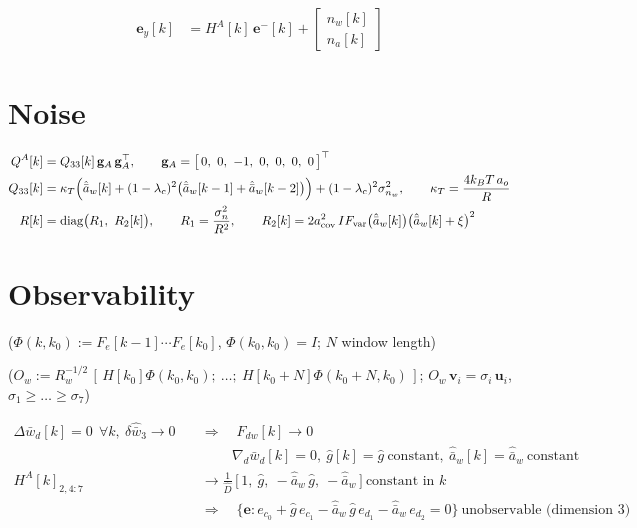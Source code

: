 \documentclass[11pt,a4paper,fontset=none]{ctexart}
\newcommand{\ba}{\bar{a}}
\newcommand{\bw}{\bar{w}}
\newcommand{\ah}{\hat{\ba}_w}
\newcommand{\gh}{\hat g}
\newcommand{\Dh}{\hat D}
\begin{document}
\begin{align*}
\mathbf{e}_y[k] &= H^{A}[k]\,\mathbf{e}^{-}[k] + \begin{bmatrix} n_w[k] \\ n_a[k] \end{bmatrix}
\end{align*}

\section{Noise}

\begin{align*}
Q^{A}[k]  &= Q_{33}[k]\,\mathbf{g}_A\,\mathbf{g}_A^{\top}, \qquad \mathbf{g}_A = \bigl[\,0,\ 0,\ -1,\ 0,\ 0,\ 0,\ 0\,\bigr]^{\top} \\
Q_{33}[k] &= \kappa_T\Bigl(\ah[k] + (1-\lambda_c)^{2}\bigl(\ah[k-1] + \ah[k-2]\bigr)\Bigr) + (1-\lambda_c)^{2}\sigma^{2}_{n_w},
\qquad \kappa_T = \frac{4k_BT\,a_o}{R} \\
R[k]      &= \mathrm{diag}\bigl(R_1,\ R_2[k]\bigr), \qquad R_1 = \frac{\sigma^{2}_{n}}{R^{2}}, \qquad
R_2[k] = 2a_{\mathrm{cov}}^{2}\,IF_{\mathrm{var}}\bigl(\ah[k]\bigr)\bigl(\ah[k] + \xi\bigr)^{2}
\end{align*}

\clearpage
\section{Observability}

($\Phi(k,k_0) := F_e[k-1]\cdots F_e[k_0]$, $\Phi(k_0,k_0) = I$; $N$ window length)

($O_w := R_w^{-1/2}\,[\,H[k_0]\Phi(k_0,k_0);\ \dots;\ H[k_0+N]\Phi(k_0+N,k_0)\,]$;
$O_w\,\mathbf{v}_i = \sigma_i\,\mathbf{u}_i$, $\sigma_1 \ge \dots \ge \sigma_7$)

\begin{align*}
\Delta\bw_d[k] = 0 \ \ \forall k,\ \delta\hat{\bw}_3 \to 0 \quad&\Longrightarrow\quad
F_{dw}[k] \to 0 \\
&\qquad\ \nabla_d\bw_d[k] = 0,\ \gh[k] = \gh\ \text{constant},\ \ah[k] = \ah\ \text{constant} \\
H^{A}[k]_{2,4:7} &\to \frac{1}{\Dh}\,\bigl[\,1,\ \gh,\ -\ah\,\gh,\ -\ah\,\bigr] \ \text{constant in } k \\
&\Longrightarrow\quad \bigl\{\mathbf{e} : e_{c_0} + \gh\,e_{c_1} - \ah\,\gh\,e_{d_1} - \ah\,e_{d_2} = 0\bigr\} \ \text{unobservable (dimension 3)}
\end{align*}
\end{document}
